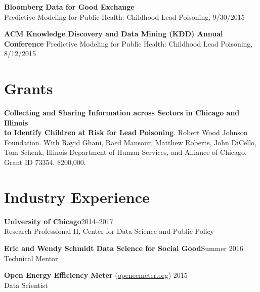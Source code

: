 \documentclass[margin,line]{resume}
\begin{document}
\begin{resume}
	{\bf Bloomberg Data for Good Exchange} \\
        Predictive Modeling for Public Health: Childhood Lead Poisoning, 9/30/2015 

    {\bf ACM Knowledge Discovery and Data Mining (KDD) Annual Conference} 
        Predictive Modeling for Public Health: Childhood Lead Poisoning, 8/12/2015

	\section{\mysidestyle Grants}
        {\bf Collecting and Sharing Information across Sectors in Chicago and Illinois\\ to Identify Children at Risk for Lead Poisoning}. Robert Wood Johnson\\ Foundation. With Rayid Ghani, Raed Mansour, Matthew Roberts, John DiCello,\\ Tom Schenk,  Illinois Department of Human Services, and Alliance of Chicago.\\ Grant ID 73354. \$200,000. \\

        \section{\mysidestyle Industry Experience}
	{\bf University of Chicago}\hfill{2014--2017}\\
	Research Professional II, Center for Data Science and Public Policy

        {\bf Eric and Wendy Schmidt Data Science for Social Good}\hfill{Summer 2016}\\
	Technical Mentor

	{\bf Open Energy Efficiency Meter} (\href{http://www.openeemeter.org/}{openeemeter.org}) \hfill {2015} \\
	Data Scientist


\end{resume}
\end{document}
